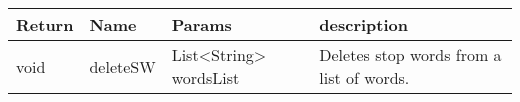 \begin{tabular}{p{}p{}p{}p{}} 
	\hline \hline
	
	Return & Name & Params & description \\
	
	\hline\hline

	void & deleteSW & List<String> wordsList & 
	Deletes stop words from a list of words. \\
	
	\hline \hline
\end{tabular}